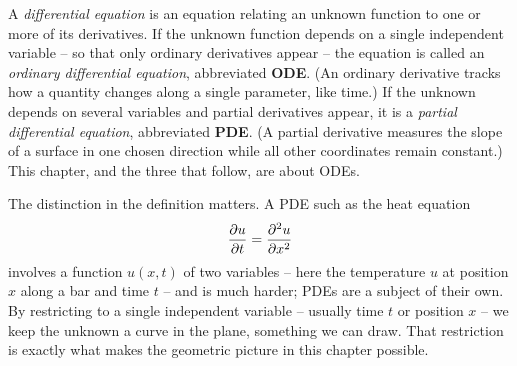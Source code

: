 \begin{definition}
\label{ch36:def-de}
A \emph{differential equation} is an equation relating an unknown function to one or more of its derivatives. If the unknown function depends on a single independent variable -- so that only ordinary derivatives appear -- the equation is called an \emph{ordinary differential equation}, abbreviated \textbf{ODE}. (An ordinary derivative tracks how a quantity changes along a single parameter, like time.) If the unknown depends on several variables and partial derivatives appear, it is a \emph{partial differential equation}, abbreviated \textbf{PDE}. (A partial derivative measures the slope of a surface in one chosen direction while all other coordinates remain constant.) This chapter, and the three that follow, are about ODEs.
\end{definition}

The distinction in the definition matters. A PDE such as the heat equation
\[
  \frac{\partial u}{\partial t} = \frac{\partial^2 u}{\partial x^2}
\]
involves a function $u(x,t)$ of two variables -- here the temperature $u$ at position $x$ along a bar and time $t$ -- and is much harder; PDEs are a subject of their own. By restricting to a single independent variable -- usually time $t$ or position $x$ -- we keep the unknown a curve in the plane, something we can draw. That restriction is exactly what makes the geometric picture in this chapter possible.

